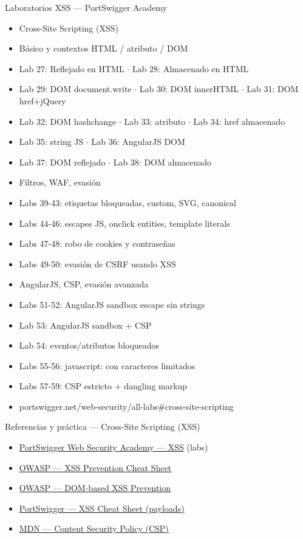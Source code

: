\documentclass[aspectratio=169,10pt]{beamer}
\begin{document}
\begin{frame}[allowframebreaks]{Laboratorios XSS --- PortSwigger Academy}
\small
  \begin{itemize}
  \item Cross-Site Scripting (XSS)
  \item Básico y contextos HTML / atributo / DOM
  \item Lab 27: Reflejado en HTML $\cdot$ Lab 28: Almacenado en HTML
  \item Lab 29: DOM document.write $\cdot$ Lab 30: DOM innerHTML $\cdot$ Lab 31: DOM href+jQuery
  \item Lab 32: DOM hashchange $\cdot$ Lab 33: atributo $\cdot$ Lab 34: href almacenado
  \item Lab 35: string JS $\cdot$ Lab 36: AngularJS DOM
  \item Lab 37: DOM reflejado $\cdot$ Lab 38: DOM almacenado
  \item Filtros, WAF, evasión
  \item Labs 39-43: etiquetas bloqueadas, custom, SVG, canonical
  \item Labs 44-46: escapes JS, onclick entities, template literals
  \item Labs 47-48: robo de cookies y contraseñas
  \item Labs 49-50: evasión de CSRF usando XSS
  \item AngularJS, CSP, evasión avanzada
  \item Labs 51-52: AngularJS sandbox escape sin strings
  \item Lab 53: AngularJS sandbox + CSP
  \item Lab 54: eventos/atributos bloqueados
  \item Labs 55-56: javascript: con caracteres limitados
  \item Labs 57-59: CSP estricto + dangling markup
  \item portswigger.net/web-security/all-labs\#cross-site-scripting
  \end{itemize}
\end{frame}

\begin{frame}{Referencias y práctica --- Cross-Site Scripting (XSS)}
\footnotesize
  \begin{itemize}
  \item \href{https://portswigger.net/web-security/cross-site-scripting}{PortSwigger Web Security Academy --- XSS} (labs)
  \item \href{https://cheatsheetseries.owasp.org/cheatsheets/Cross_Site_Scripting_Prevention_Cheat_Sheet.html}{OWASP --- XSS Prevention Cheat Sheet}
  \item \href{https://cheatsheetseries.owasp.org/cheatsheets/DOM_based_XSS_Prevention_Cheat_Sheet.html}{OWASP --- DOM-based XSS Prevention}
  \item \href{https://portswigger.net/web-security/cross-site-scripting/cheat-sheet}{PortSwigger --- XSS Cheat Sheet (payloads)}
  \item \href{https://developer.mozilla.org/en-US/docs/Web/HTTP/CSP}{MDN --- Content Security Policy (CSP)}
  \end{itemize}
\end{frame}
\end{document}
